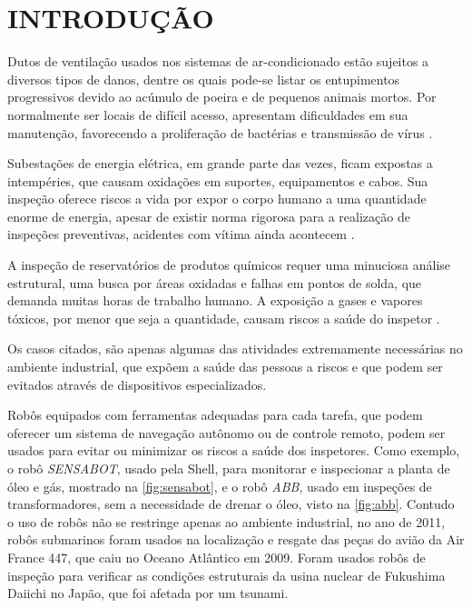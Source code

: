 
\chapter{INTRODUÇÃO}
\label{chap:introducao}

Dutos de ventilação usados nos sistemas de ar-condicionado estão sujeitos a diversos tipos de danos, dentre os quais pode-se listar os entupimentos progressivos devido ao acúmulo de poeira e de pequenos animais mortos.  Por normalmente ser locais de difícil acesso, apresentam dificuldades em sua manutenção, favorecendo a proliferação de bactérias e transmissão de vírus .\par
Subestações de energia elétrica, em grande parte das vezes, ficam expostas a intempéries, que causam oxidações em suportes, equipamentos e cabos. Sua inspeção oferece riscos a vida por expor o corpo humano a uma quantidade enorme de energia, apesar de existir norma rigorosa para a realização de inspeções preventivas, acidentes com vítima ainda acontecem .\par
A inspeção de reservatórios de produtos químicos requer uma minuciosa análise estrutural, uma busca por áreas oxidadas e falhas em pontos de solda, que demanda muitas horas de trabalho humano. A exposição a gases e vapores tóxicos, por menor que seja a quantidade, causam riscos a saúde do inspetor .\par
Os casos citados, são apenas algumas das atividades extremamente necessárias no ambiente industrial, que expõem a saúde das pessoas a riscos e que podem ser evitados através de dispositivos especializados. \par 
Robôs equipados com ferramentas adequadas para cada tarefa, que podem oferecer um sistema de navegação autônomo ou de controle remoto, podem ser usados para evitar ou minimizar os riscos a saúde dos inspetores. Como exemplo, o robô \textit{SENSABOT}, usado pela Shell, para monitorar e inspecionar a planta de óleo e gás, mostrado na \autoref{fig:sensabot}, e o robô \textit{ABB}, usado em inspeções de transformadores, sem a necessidade de drenar o óleo, visto na \autoref{fig:abb}. Contudo o uso de robôs não se restringe apenas ao ambiente industrial, no ano de 2011, robôs submarinos foram usados na localização e resgate das peças do avião da Air France 447, que caiu no Oceano Atlântico em 2009. Foram usados robôs de inspeção para verificar as condições estruturais da usina nuclear de Fukushima Daiichi no Japão, que foi afetada por um tsunami. 

